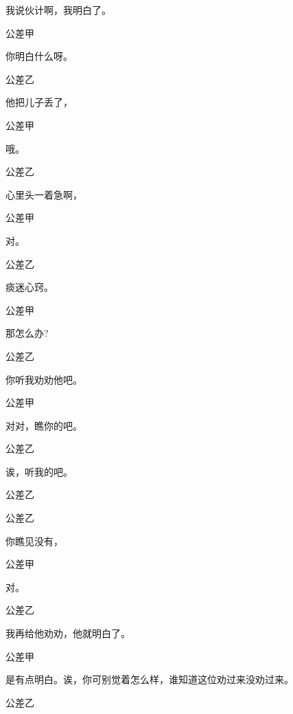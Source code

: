 我说伙计啊，我明白了。

公差甲\hspace{20pt}~

你明白什么呀。

公差乙\hspace{20pt}~

他把儿子丢了，

公差甲\hspace{20pt}~

哦。

公差乙\hspace{20pt}~

心里头一着急啊，

公差甲\hspace{20pt}~

对。

公差乙\hspace{20pt}~

痰迷心窍。

公差甲\hspace{20pt}~

那怎么办?

公差乙\hspace{20pt}~

你听我劝劝他吧。

公差甲\hspace{20pt}~

对对，瞧你的吧。

公差乙\hspace{20pt}~

诶，听我的吧。

公差乙\hspace{20pt}~


公差乙\hspace{20pt}~

你瞧见没有，

公差甲\hspace{20pt}~

对。

公差乙\hspace{20pt}~

我再给他劝劝，他就明白了。

公差甲\hspace{20pt}~

是有点明白。诶，你可别觉着怎么样，谁知道这位劝过来没劝过来。

公差乙\hspace{20pt}~

